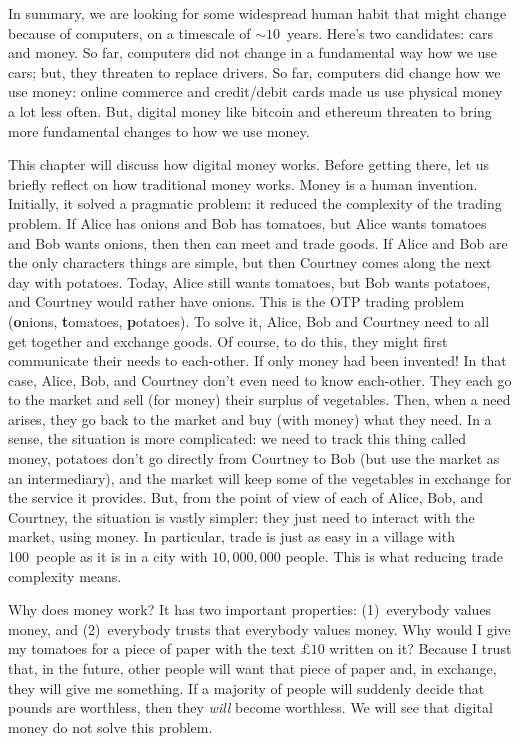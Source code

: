 In summary, we are looking for some widespread human habit that might change because of computers, on a timescale of $\sim10$~years.
Here's two candidates: cars and money.
So far, computers did not change in a fundamental way how we use cars; but, they threaten to replace drivers.
So far, computers did change how we use money: online commerce and credit/debit cards made us use physical money a lot less often.
But, digital money like bitcoin and ethereum threaten to bring more fundamental changes to how we use money.

This chapter will discuss how digital money works.
Before getting there, let us briefly reflect on how traditional money works.
Money is a human invention.
Initially, it solved a pragmatic problem: it reduced the complexity of the trading problem.
If Alice has onions and Bob has tomatoes, but Alice wants tomatoes and Bob wants onions, then then can meet and trade goods.
If Alice and Bob are the only characters things are simple, but then Courtney comes along the next day with potatoes.
Today, Alice still wants tomatoes, but Bob wants potatoes, and Courtney would rather have onions.
This is the OTP trading problem ({\bf o}nions, {\bf t}omatoes, {\bf p}otatoes).
To solve it, Alice, Bob and Courtney need to all get together and exchange goods.
Of course, to do this, they might first communicate their needs to each-other.
If only money had been invented!
In that case, Alice, Bob, and Courtney don't even need to know each-other.
They each go to the market and sell (for money) their surplus of vegetables.
Then, when a need arises, they go back to the market and buy (with money) what they need.
In a sense, the situation is more complicated: we need to track this thing called money, potatoes don't go directly from Courtney to Bob (but use the market as an intermediary), and the market will keep some of the vegetables in exchange for the service it provides.
But, from the point of view of each of Alice, Bob, and Courtney, the situation is vastly simpler: they just need to interact with the market, using money.
In particular, trade is just as easy in a village with 100~people as it is in a city with $10{,}000{,}000$ people.
This is what reducing trade complexity means.

Why does money work?
It has two important properties: (1)~everybody values money, and (2)~everybody trusts that everybody values money.
Why would I give my tomatoes for a piece of paper with the text $\pounds10$ written on it?
Because I trust that, in the future, other people will want that piece of paper and, in exchange, they will give me something.
If a majority of people will suddenly decide that pounds are worthless, then they \emph{will} become worthless.
We will see that digital money do not solve this problem.

